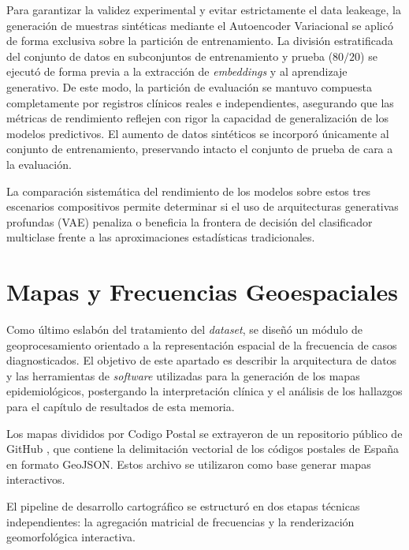 \documentclass[12pt,a4paper,onecolumn,oneside]{report}
\begin{document}
\begin{tcolorbox}[colback=gray!5,colframe=gray!60,title=\textbf{Nota Metodológica sobre el proceso VAE 2: Prevención de Fuga de Datos en el Generación Sintética}]
Para garantizar la validez experimental y evitar estrictamente el data leakeage, la generación de muestras sintéticas mediante el Autoencoder Variacional se aplicó de forma exclusiva sobre la partición de entrenamiento. La división estratificada del conjunto de datos en subconjuntos de entrenamiento y prueba ($80/20$) se ejecutó de forma previa a la extracción de \textit{embeddings} y al aprendizaje generativo. De este modo, la partición de evaluación se mantuvo compuesta completamente por registros clínicos reales e independientes, asegurando que las métricas de rendimiento reflejen con rigor la capacidad de generalización de los modelos predictivos. El aumento de datos sintéticos se incorporó únicamente al conjunto de entrenamiento, preservando intacto el conjunto de prueba de cara a la evaluación.
\end{tcolorbox}

La comparación sistemática del rendimiento de los modelos sobre estos tres escenarios compositivos permite determinar si el uso de arquitecturas generativas profundas (VAE) penaliza o beneficia la frontera de decisión del clasificador multiclase frente a las aproximaciones estadísticas tradicionales.
\section{Mapas y Frecuencias Geoespaciales}

Como último eslabón del tratamiento del \textit{dataset}, se diseñó un módulo de geoprocesamiento orientado a la representación espacial de la frecuencia de casos diagnosticados. El objetivo de este apartado es describir la arquitectura de datos y las herramientas de \textit{software} utilizadas para la generación de los mapas epidemiológicos, postergando la interpretación clínica y el análisis de los hallazgos para el capítulo de resultados de esta memoria.

Los mapas divididos por Codigo Postal se extrayeron de un repositorio público de GitHub \cite{github_geojson}, que contiene la delimitación vectorial de los códigos postales de España en formato GeoJSON. Estos archivo se utilizaron como base generar mapas interactivos.

El pipeline de desarrollo cartográfico se estructuró en dos etapas técnicas independientes: la agregación matricial de frecuencias y la renderización geomorfológica interactiva.
\end{document}
